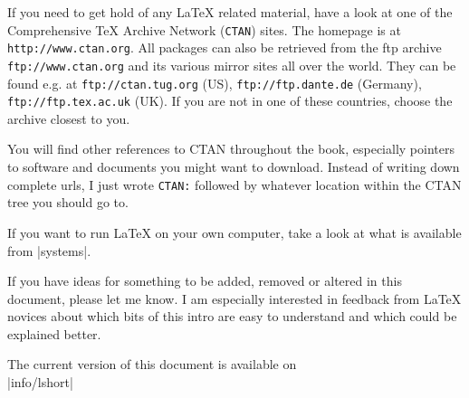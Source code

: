 \bigskip
\noindent If you need to get hold of any \LaTeX{} related material, 
have a look at one of the Comprehensive \TeX{} Archive Network
(\texttt{CTAN}) sites. The homepage is at
\texttt{http://www.ctan.org}. All packages can also be retrieved from
the ftp archive \texttt{ftp://www.ctan.org} and its various mirror
sites all over the world.  They can be found e.g.{} at
\texttt{ftp://ctan.tug.org} (US), \texttt{ftp://ftp.dante.de}
(Germany), \texttt{ftp://ftp.tex.ac.uk} (UK).  If you are not in one
of these countries, choose the archive closest to you.

You will find other references to CTAN throughout the book, especially
pointers to software and documents you might want to download. Instead
of writing down complete urls, I just wrote \texttt{CTAN:} followed by
whatever location within the CTAN tree you should go to. 

If you want to run \LaTeX{} on your own computer, take a look at what
is available from \CTAN|systems|.

\noindent If you have ideas for something to be
added, removed or altered in this document, please let me know. I am
especially interested in feedback from \LaTeX{} novices about which
bits of this intro are easy to understand and which could be explained
better.

\bigskip
\begin{verse}
%
\end{verse}
\noindent The current version of this document is available on\\
\CTAN|info/lshort|

\endinput



%

